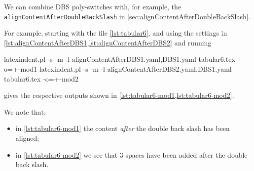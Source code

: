   \begin{example}
  We can combine DBS poly-switches with, for example, the
  \texttt{alignContentAfterDoubleBackSlash} in
  \vref{sec:alignContentAfterDoubleBackSlash}.

  For example, starting with the file \cref{lst:tabular6}, and using the settings in
  \vref{lst:alignContentAfterDBS1,lst:alignContentAfterDBS2} and running
  \begin{widepage}

   \begin{commandshell}
latexindent.pl -s -m -l alignContentAfterDBS1.yaml,DBS1.yaml tabular6.tex -o=+-mod1
latexindent.pl -s -m -l alignContentAfterDBS2.yaml,DBS1.yaml tabular6.tex -o=+-mod2
\end{commandshell}

  \end{widepage}
  gives the respective outputs shown in \cref{lst:tabular6-mod1,lst:tabular6-mod2}.
  \begin{cmhtcbraster}[raster columns=3,
    raster left skip=-3.5cm,
    raster right skip=-2cm,
    raster column skip=.03\linewidth]
  \end{cmhtcbraster}
  We note that:
  \begin{itemize}
   \item in \cref{lst:tabular6-mod1} the content \emph{after} the double back slash has
         been aligned;
   \item in \cref{lst:tabular6-mod2} we see that 3 spaces have been added after the
         double back slash.
  \end{itemize}
  \end{example}

